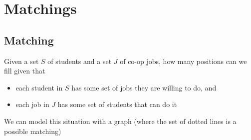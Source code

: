 \chapter{Matchings}
\section{Matching}
Given a set $ S $ of students and a set $ J $ of co-op jobs, how many positions
can we fill given that
\begin{itemize}
    \item each student in $ S $ has some set of jobs they are willing to do, and
    \item each job in $ J $ has some set of students that can do it
\end{itemize}
We can model this situation with a graph (where the set of dotted lines is a possible matching)

